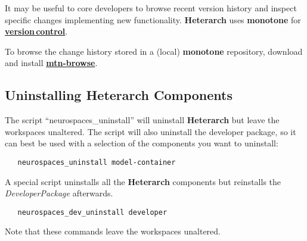 \documentclass[12pt]{article}
\begin{document}
It may be useful to core developers to browse recent version history
and inspect specific changes implementing new functionality.  {\bf\small{Heterarch}} uses {\bf monotone} for
\href{../version-control/version-control.tex}{\bf version\,control}.

To browse the change history stored in a (local) {\bf monotone}
repository,
 download and install \href{http://www.coosoft.plus.com/software.html}{\bf mtn-browse}.


\subsection*{Uninstalling Heterarch Components}

The script ``neurospaces\_uninstall'' will uninstall
{\bf\small{Heterarch}} but leave the workspaces unaltered.  The script
will also uninstall the developer package, so it can best be used with
a selection of the components you want to uninstall:

\begin{verbatim}
   neurospaces_uninstall model-container
\end{verbatim}
A special script uninstalls all the {\bf\small{Heterarch}} components but reinstalls the
{\it DeveloperPackage} afterwards.
\begin{verbatim}
   neurospaces_dev_uninstall developer
\end{verbatim}
Note that these commands leave the workspaces unaltered.
\end{document}
